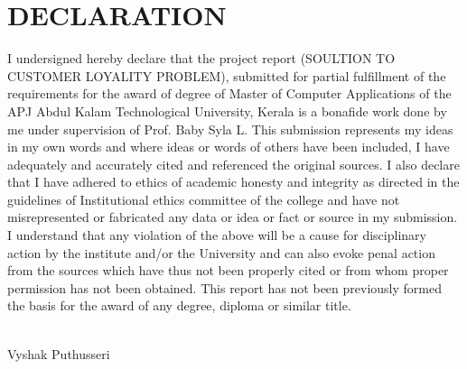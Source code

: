\chapter*{\rm \large \bf DECLARATION}
\vspace{4.0mm}
\setlength{\parindent}{6em}
I undersigned hereby declare that the project report
(SOULTION TO CUSTOMER LOYALITY PROBLEM), submitted for partial
fulfillment of the requirements for the award of degree of Master of Computer Applications
of the APJ Abdul Kalam Technological University, Kerala is a bonafide work done
by me under supervision of Prof. Baby Syla L. This submission represents my
ideas in my own words and where ideas or words of others have been included, I
have adequately and accurately cited and referenced the original sources. I also
declare that I have adhered to ethics of academic honesty and integrity as directed in the guidelines of Institutional ethics committee of the college and have not misrepresented or fabricated any data or idea or fact or source in my
submission. I understand that any violation of the above will be a cause for
disciplinary action by the institute and/or the University and can also evoke
penal action from the sources which have thus not been properly cited or from
whom proper permission has not been obtained. This report has not been
previously formed the basis for the award of any degree, diploma or similar
title.

\vspace{0.3 cm}

\\
\hfill {Vyshak Puthusseri}\\

\newpage 
